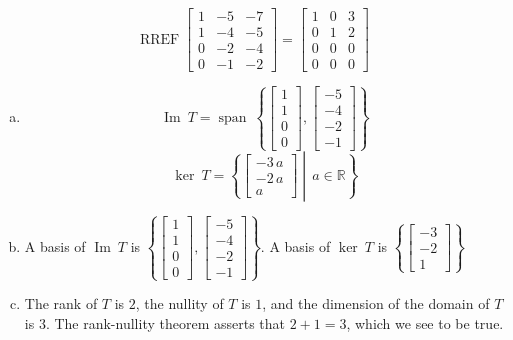 \begin{exerciseAnswer} 


\[\operatorname{RREF} \left[\begin{array}{ccc}
1 & -5 & -7 \\
1 & -4 & -5 \\
0 & -2 & -4 \\
0 & -1 & -2
\end{array}\right] = \left[\begin{array}{ccc}
1 & 0 & 3 \\
0 & 1 & 2 \\
0 & 0 & 0 \\
0 & 0 & 0
\end{array}\right] \]


\begin{enumerate}[(a)]
\item \[\operatorname{Im}\ T = \operatorname{span}\  \left\{ \left[\begin{array}{c}
1 \\
1 \\
0 \\
0
\end{array}\right] , \left[\begin{array}{c}
-5 \\
-4 \\
-2 \\
-1
\end{array}\right] \right\} \]\[\operatorname{ker}\ T =  \left\{ \left[\begin{array}{c}
-3 \, a \\
-2 \, a \\
a
\end{array}\right] \middle|\,a\in\mathbb{R}\right\} \]
\item  A basis of \(\operatorname{Im}\ T\) is \( \left\{ \left[\begin{array}{c}
1 \\
1 \\
0 \\
0
\end{array}\right] , \left[\begin{array}{c}
-5 \\
-4 \\
-2 \\
-1
\end{array}\right] \right\} \). A basis of \(\operatorname{ker}\ T\) is \( \left\{ \left[\begin{array}{c}
-3 \\
-2 \\
1
\end{array}\right] \right\} \)
\item  The rank of \(T\) is \( 2 \), the nullity of \(T\) is \( 1 \), and the dimension of the domain of \(T\) is \( 3 \). The rank-nullity theorem asserts that \( 2 + 1 = 3 \), which we see to be true. 
\end{enumerate}
    
\end{exerciseAnswer}
    
